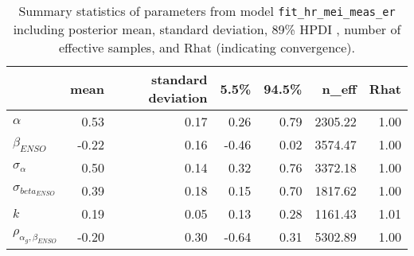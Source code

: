 \begin{table}[ht]
\centering
\begin{tabular}{lrrrrrr}
  \hline
 & mean & standard deviation & 5.5\% & 94.5\% & n\_eff & Rhat \\ 
  \hline
$\alpha$ & 0.53 & 0.17 & 0.26 & 0.79 & 2305.22 & 1.00 \\ 
  $\beta_{ENSO}$ & -0.22 & 0.16 & -0.46 & 0.02 & 3574.47 & 1.00 \\ 
  $\sigma_{\alpha}$ & 0.50 & 0.14 & 0.32 & 0.76 & 3372.18 & 1.00 \\ 
  $\sigma_{beta_{ENSO}}$ & 0.39 & 0.18 & 0.15 & 0.70 & 1817.62 & 1.00 \\ 
  $k$ & 0.19 & 0.05 & 0.13 & 0.28 & 1161.43 & 1.01 \\ 
  $\rho_{\alpha_g,\beta_{ENSO}}$ & -0.20 & 0.30 & -0.64 & 0.31 & 5302.89 & 1.00 \\ 
   \hline
\end{tabular}
\caption{Summary statistics of parameters from model \texttt{fit\_hr\_mei\_meas\_er} including posterior mean, standard deviation, 89\% HPDI , number of effective samples, and Rhat (indicating convergence).} 
\label{tab:precis_hr_mei_me}
\end{table}
